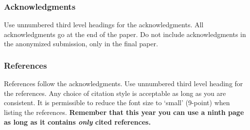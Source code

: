 \documentclass{article} %
\begin{document}

 
 


\subsubsection*{Acknowledgments}

Use unnumbered third level headings for the acknowledgments. All
acknowledgments go at the end of the paper. Do not include 
acknowledgments in the anonymized submission, only in the 
final paper. 

\subsubsection*{References}

References follow the acknowledgments. Use unnumbered third level heading for
the references. Any choice of citation style is acceptable as long as you are
consistent. It is permissible to reduce the font size to `small' (9-point) 
when listing the references. {\bf Remember that this year you can use
a ninth page as long as it contains \emph{only} cited references.}
\end{document}

